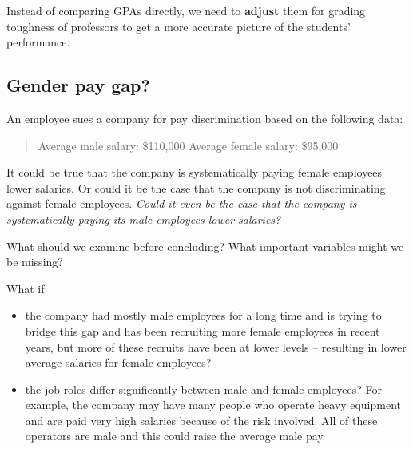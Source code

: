 \documentclass[
  12pt,
  letterpaper,
  DIV=11,
  numbers=noendperiod]{scrreprt}
\begin{document}
\begin{tcolorbox}[enhanced jigsaw, colback=white, leftrule=.75mm, toprule=.15mm, bottomtitle=1mm, breakable, coltitle=black, toptitle=1mm, title=\textcolor{quarto-callout-important-color}{\faExclamation}\hspace{0.5em}{Important}, opacitybacktitle=0.6, colbacktitle=quarto-callout-important-color!10!white, arc=.35mm, left=2mm, colframe=quarto-callout-important-color-frame, titlerule=0mm, rightrule=.15mm, bottomrule=.15mm, opacityback=0]

Instead of comparing GPAs directly, we need to \textbf{adjust} them for
grading toughness of professors to get a more accurate picture of the
students' performance.

\end{tcolorbox}

\subsection{Gender pay gap?}\label{gender-pay-gap}

An employee sues a company for pay discrimination based on the following
data:

\begin{quote}
Average male salary: \$110,000 Average female salary: \$95,000
\end{quote}

It could be true that the company is systematically paying female
employees lower salaries. Or could it be the case that the company is
not discriminating against female employees. \emph{Could it even be the
case that the company is systematically paying its male employees lower
salaries?}

What should we examine before concluding? What important variables might
we be missing?

What if:

\begin{itemize}
\item
  the company had mostly male employees for a long time and is trying to
  bridge this gap and has been recruiting more female employees in
  recent years, but more of these recruits have been at lower levels --
  resulting in lower average salaries for female employees?
\item
  the job roles differ significantly between male and female employees?
  For example, the company may have many people who operate heavy
  equipment and are paid very high salaries because of the risk
  involved. All of these operators are male and this could raise the
  average male pay.
\end{itemize}
\end{document}
